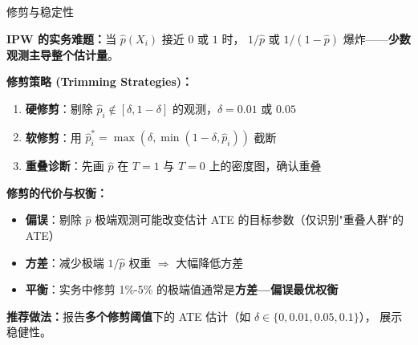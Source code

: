 \documentclass[aspectratio=169, 10pt]{beamer}
\begin{document}
\begin{frame}{修剪与稳定性}

  \textbf{IPW 的实务难题：}当 $\hat p(X_i)$ 接近 $0$ 或 $1$ 时，
  $1/\hat p$ 或 $1/(1-\hat p)$ 爆炸——\textbf{少数观测主导整个估计量}。

  \begin{highlightbox}
    \textbf{修剪策略 (Trimming Strategies)：}
    \begin{enumerate}\setlength{\itemsep}{1pt}
      \item \textbf{硬修剪}：剔除 $\hat p_i \notin [\delta, 1-\delta]$ 的观测，$\delta = 0.01$ 或 $0.05$
      \item \textbf{软修剪}：用 $\hat p_i^{*} = \max(\delta, \min(1-\delta, \hat p_i))$ 截断
      \item \textbf{重叠诊断}：先画 $\hat p$ 在 $T=1$ 与 $T=0$ 上的密度图，确认重叠
    \end{enumerate}
  \end{highlightbox}

  \begin{keybox}
    \textbf{修剪的代价与权衡：}
    \begin{itemize}\setlength{\itemsep}{1pt}
      \item \textbf{偏误}：剔除 $\hat p$ 极端观测可能改变估计 ATE 的目标参数（仅识别"重叠人群"的 ATE）
      \item \textbf{方差}：减少极端 $1/\hat p$ 权重 $\Rightarrow$ 大幅降低方差
      \item \textbf{平衡}：实务中修剪 1\%-5\% 的极端值通常是\textbf{方差—偏误最优权衡}
    \end{itemize}
  \end{keybox}

  \begin{keybox}
    \textbf{推荐做法：}报告\textbf{多个修剪阈值}下的 ATE 估计（如 $\delta \in \{0, 0.01, 0.05, 0.1\}$），
    展示稳健性。
  \end{keybox}

\end{frame}
\end{document}
